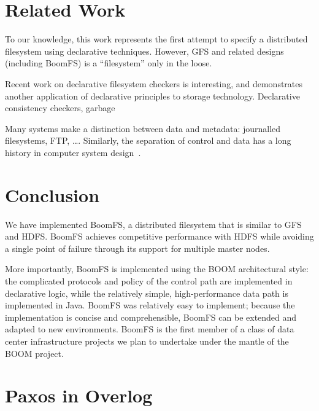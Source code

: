 \documentclass{article}
\begin{document}
\section{Related Work}
\label{related-work}
To our knowledge, this work represents the first attempt to specify a
distributed filesystem using declarative techniques. However, GFS and
related designs (including BoomFS) is a ``filesystem'' only in the
loose.

Recent work on declarative filesystem checkers is interesting, and
demonstrates another application of declarative principles to storage
technology. Declarative consistency checkers, garbage

Many systems make a distinction between data and metadata: journalled
filesystems, FTP, \ldots. Similarly, the separation of control and
data has a long history in computer system
design~\cite{hydra-policy-mech-sep}.

\section{Conclusion}
\label{conclusion}
We have implemented BoomFS, a distributed filesystem that is similar
to GFS and HDFS. BoomFS achieves competitive performance with HDFS
while avoiding a single point of failure through its support for
multiple master nodes.

More importantly, BoomFS is implemented using the BOOM architectural
style: the complicated protocols and policy of the control path are
implemented in declarative logic, while the relatively simple,
high-performance data path is implemented in Java. BoomFS was
relatively easy to implement; because the implementation is concise
and comprehensible, BoomFS can be extended and adapted to new
environments. BoomFS is the first member of a class of data center
infrastructure projects we plan to undertake under the mantle of the
BOOM project.



\appendix
\section{Paxos in Overlog}
\end{document}
